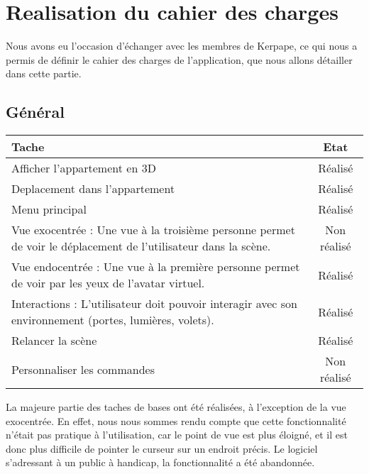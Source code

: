 \section{Realisation du cahier des charges}
Nous avons eu l'occasion d'échanger avec les membres de Kerpape, ce qui nous a permis de définir le cahier des charges de l'application, que nous allons détailler dans cette partie. \\

\subsection{Général}
\begin{tabular}{|p{13cm}|c|}
	\hline
	Tache & Etat \\ \hline
	Afficher l'appartement en 3D & Réalisé \\ \hline
	Deplacement dans l'appartement & Réalisé \\ \hline
	Menu principal & Réalisé \\ \hline
	Vue exocentrée : Une vue à la troisième personne permet de voir le déplacement de l'utilisateur dans la scène. & Non réalisé \\ \hline
	Vue endocentrée : Une vue à la première personne permet de voir par les yeux de l'avatar  virtuel. & Réalisé \\ \hline
	Interactions : L'utilisateur doit pouvoir interagir avec son environnement (portes, lumières, volets). & Réalisé \\ \hline
	Relancer la scène & Réalisé \\ \hline
	Personnaliser les commandes & Non réalisé \\ \hline
\end{tabular}
La majeure partie des taches de bases ont été réalisées, à l'exception de la vue exocentrée. 
En effet, nous nous sommes rendu compte que cette fonctionnalité n'était pas pratique à l'utilisation, car le point de vue est plus éloigné, et il est donc plus difficile de pointer le curseur sur un endroit précis.
Le logiciel s'adressant à un public à handicap, la fonctionnalité a été abandonnée.
	
